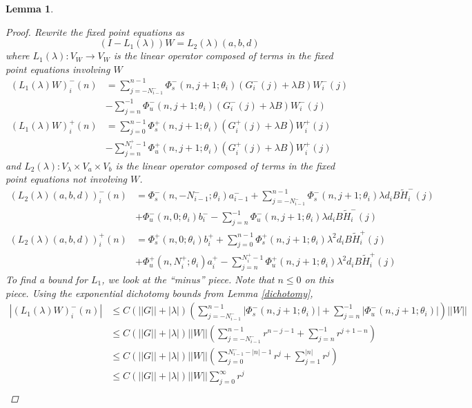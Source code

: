 \documentclass[12pt]{article}
\newtheorem{lemma}{Lemma}
\begin{document}
\begin{lemma}
\begin{proof}
Rewrite the fixed point equations as
\[
(I - L_1(\lambda))W = L_2(\lambda)(a,b,d)
\]
where $L_1(\lambda): V_W \rightarrow V_W$ is the linear operator composed of terms in the fixed point equations involving $W$
\begin{align*}
(L_1(\lambda)W)_i^-(n) &= \sum_{j = -N_{i-1}^-}^{n-1} \Phi_s^-(n, j+1; \theta_i)
(G_i^-(j) + \lambda B) W_i^-(j) \\&- \sum_{j = n}^{-1} \Phi_u^-(n, j+1; \theta_i) 
(G_i^-(j) + \lambda B) W_i^-(j)\\
(L_1(\lambda)W)_i^+(n) &= \sum_{j = 0}^{n-1} \Phi_s^+(n, j+1; \theta_i) 
(G_i^+(j) + \lambda B) W_i^+(j) \\
&-\sum_{j = n}^{N_i^+-1} \Phi_u^+(n, j+1; \theta_i) 
(G_i^+(j) + \lambda B) W_i^+(j)
\end{align*}
and $L_2(\lambda): V_\lambda \times V_a \times V_b $ is the linear operator composed of terms in the fixed point equations not involving $W$.
\begin{align*}
(L_2(\lambda)(a,b,d))_i^-(n) &= 
\Phi_s^-(n, -N_{i-1}^-; \theta_i) a_{i-1}^- + \sum_{j = -N_{i-1}^-}^{n-1} \Phi_s^-(n, j+1; \theta_i)
\lambda d_i B \tilde{H}_i^-(j)
 \\
&+ \Phi_u^-(n, 0; \theta_i) b_i^- - \sum_{j = n}^{-1} \Phi_u^-(n, j+1; \theta_i) 
\lambda d_i B \tilde{H}_i^-(j) \\
(L_2(\lambda)(a,b,d))_i^+(n) &= \Phi_s^+(n, 0; \theta_i) b_i^+ + \sum_{j = 0}^{n-1} \Phi_s^+(n, j+1; \theta_i)\lambda^2 d_i B \tilde{H}_i^+(j) \\
&+ \Phi_u^+(n, N_i^+; \theta_i) a_i^+ - \sum_{j = n}^{N_i^+-1} \Phi_u^+(n, j+1; \theta_i)\lambda^2 d_i B \tilde{H}_i^+(j)
\end{align*}
To find a bound for $L_1$, we look at the ``minus'' piece. Note that $n \leq 0$ on this piece. Using the exponential dichotomy bounds from Lemma \ref{dichotomy},
\begin{align*}
|(L_1(\lambda)W)_i^-(n)| &\leq C (||G|| + |\lambda|)\left(
\sum_{j = -N_{i-1}^-}^{n-1} |\Phi_s^-(n, j+1; \theta_i)| + \sum_{j = n}^{-1} |\Phi_u^-(n, j+1; \theta_i)| \right) ||W|| \\
&\leq C (||G|| + |\lambda|) ||W||
\left( \sum_{j = -N_{i-1}^-}^{n-1} r^{n - j - 1} + \sum_{j = n}^{-1} r^{j+1-n} \right) \\
&\leq C (||G|| + |\lambda|) ||W||
\left( \sum_{j = 0}^{N_{i-1}^- -|n| -1} r^j + \sum_{j = 1}^{|n|} r^j \right) \\
&\leq C (||G|| + |\lambda|) ||W||\sum_{j = 0}^\infty r^j \\

\end{align*}
\end{proof}
\end{lemma}
\end{document}
